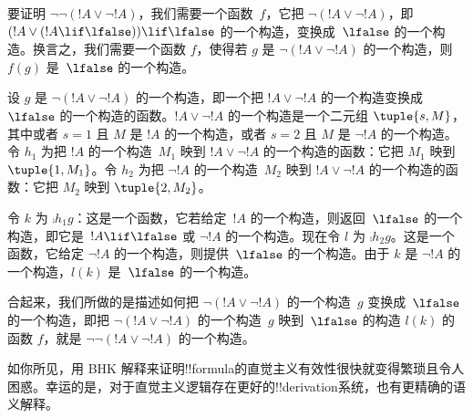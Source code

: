 \documentclass[../../../include/open-logic-section]{subfiles}
\begin{document}
\begin{ex}
要证明 $\lnot \lnot (!A \lor \lnot !A)$，我们需要一个函数~$f$，它把 $\lnot(!A \lor \lnot !A)$，即 $(!A \lor (!A \lif \lfalse)) \lif \lfalse$ 的一个构造，变换成~$\lfalse$ 的一个构造。换言之，我们需要一个函数 $f$，使得若 $g$ 是 $\lnot(!A \lor \lnot !A)$ 的一个构造，则 $f(g)$ 是~$\lfalse$ 的一个构造。

设 $g$ 是 $\lnot(!A \lor \lnot !A)$ 的一个构造，即一个把 $!A \lor \lnot !A$ 的一个构造变换成~$\lfalse$ 的一个构造的函数。$!A \lor \lnot !A$ 的一个构造是一个二元组 $\tuple{s, M}$，其中或者 $s = 1$ 且 $M$ 是 $!A$ 的一个构造，或者 $s = 2$ 且 $M$ 是 $\lnot !A$ 的一个构造。令 $h_1$ 为把 $!A$ 的一个构造~$M_1$ 映到 $!A \lor \lnot !A$ 的一个构造的函数：它把 $M_1$ 映到 $\tuple{1, M_1}$。令 $h_2$ 为把 $\lnot !A$ 的一个构造~$M_2$ 映到 $!A \lor \lnot !A$ 的一个构造的函数：它把 $M_2$ 映到 $\tuple{2, M_2}$。

令 $k$ 为 $\comp{h_1}{g}$：这是一个函数，它若给定~$!A$ 的一个构造，则返回~$\lfalse$ 的一个构造，即它是~$!A \lif \lfalse$ 或 $\lnot !A$ 的一个构造。现在令 $l$ 为 $\comp{h_2}{g}$。这是一个函数，它给定 $\lnot !A$ 的一个构造，则提供~$\lfalse$ 的一个构造。由于 $k$ 是 $\lnot !A$ 的一个构造，$l(k)$ 是~$\lfalse$ 的一个构造。

合起来，我们所做的是描述如何把 $\lnot(!A \lor \lnot !A)$ 的一个构造~$g$ 变换成~$\lfalse$ 的一个构造，即把 $\lnot(!A \lor \lnot !A)$ 的一个构造~$g$ 映到~$\lfalse$ 的构造 $l(k)$ 的函数 $f$，就是 $\lnot\lnot(!A \lor \lnot !A)$ 的一个构造。
\end{ex}

如你所见，用 BHK 解释来证明!!{formula}的直觉主义有效性很快就变得繁琐且令人困惑。幸运的是，对于直觉主义逻辑存在更好的!!{derivation}系统，也有更精确的语义解释。
\end{document}
